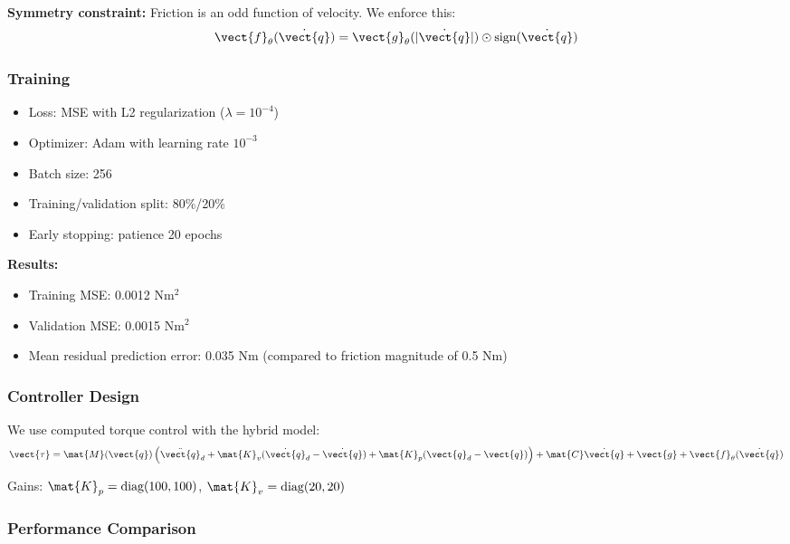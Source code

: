 \textbf{Symmetry constraint:} Friction is an odd function of velocity. We enforce this:
\begin{equation}
\vect{f}_\theta(\dot{\vect{q}}) = \vect{g}_\theta(|\dot{\vect{q}}|) \odot \text{sign}(\dot{\vect{q}})
\end{equation}

\subsubsection{Training}

\begin{itemize}
    \item Loss: MSE with L2 regularization ($\lambda = 10^{-4}$)
    \item Optimizer: Adam with learning rate $10^{-3}$
    \item Batch size: 256
    \item Training/validation split: 80\%/20\%
    \item Early stopping: patience 20 epochs
\end{itemize}

\textbf{Results:}
\begin{itemize}
    \item Training MSE: 0.0012 Nm$^2$
    \item Validation MSE: 0.0015 Nm$^2$
    \item Mean residual prediction error: 0.035 Nm (compared to friction magnitude of 0.5 Nm)
\end{itemize}

\subsubsection{Controller Design}

We use computed torque control with the hybrid model:
\begin{equation}
\vect{\tau} = \mat{M}(\vect{q})\left(\ddot{\vect{q}}_d + \mat{K}_v(\dot{\vect{q}}_d - \dot{\vect{q}}) + \mat{K}_p(\vect{q}_d - \vect{q})\right) + \mat{C}\dot{\vect{q}} + \vect{g} + \vect{f}_\theta(\dot{\vect{q}})
\end{equation}

Gains: $\mat{K}_p = \text{diag}(100, 100)$, $\mat{K}_v = \text{diag}(20, 20)$

\subsubsection{Performance Comparison}

